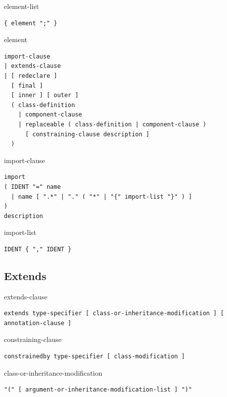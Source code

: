 \begin{production}{element-list}
\begin{lstlisting}
{ element ";" }
\end{lstlisting}
\end{production}

\begin{production}{element}
\begin{lstlisting}
import-clause
| extends-clause
| [ redeclare ]
  [ final ]
  [ inner ] [ outer ]
  ( class-definition
    | component-clause
    | replaceable ( class-definition | component-clause )
      [ constraining-clause description ]
  )
\end{lstlisting}
\end{production}

\begin{production}{import-clause}
\begin{lstlisting}
import
( IDENT "=" name
  | name [ ".*" | "." ( "*" | "{" import-list "}" ) ]
)
description
\end{lstlisting}
\end{production}

\begin{production}{import-list}
\begin{lstlisting}
IDENT { "," IDENT }
\end{lstlisting}
\end{production}


\subsection{Extends}\label{extends}

\begin{production}{extends-clause}
\begin{lstlisting}
extends type-specifier [ class-or-inheritance-modification ] [ annotation-clause ]
\end{lstlisting}
\end{production}

\begin{production}{constraining-clause}
\begin{lstlisting}
constrainedby type-specifier [ class-modification ]
\end{lstlisting}
\end{production}

\begin{production}{class-or-inheritance-modification}
\begin{lstlisting}
"(" [ argument-or-inheritance-modification-list ] ")"
\end{lstlisting}
\end{production}

